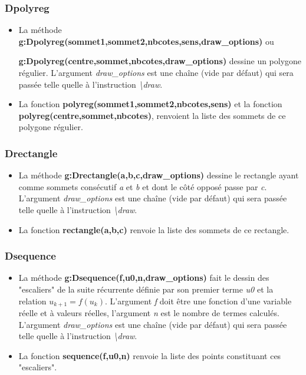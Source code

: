 \documentclass[%
10pt,%
a4paper,%
french,%
]%
{article}%
\begin{document}
\subsubsection{Dpolyreg}
\begin{itemize}
    \item La méthode \textbf{g:Dpolyreg(sommet1,sommet2,nbcotes,sens,draw\_options)} ou \par \textbf{g:Dpolyreg(centre,sommet,nbcotes,draw\_options)} dessine un polygone régulier. L'argument \emph{draw\_options} est une chaîne (vide par défaut) qui sera passée telle quelle à l'instruction \emph{\textbackslash draw}.
    \item La fonction \textbf{polyreg(sommet1,sommet2,nbcotes,sens)} et la fonction \textbf{polyreg(centre,sommet,nbcotes)}, renvoient la liste des sommets de ce polygone régulier.
\end{itemize}

\subsubsection{Drectangle}
\begin{itemize}
    \item La méthode \textbf{g:Drectangle(a,b,c,draw\_options)} dessine le rectangle ayant comme sommets consécutif \emph{a} et \emph{b} et dont le côté opposé passe par \emph{c}. L'argument \emph{draw\_options} est une chaîne (vide par défaut) qui sera passée telle quelle à l'instruction \emph{\textbackslash draw}.
    \item La fonction \textbf{rectangle(a,b,c)} renvoie la liste des sommets de ce rectangle.
\end{itemize}

\subsubsection{Dsequence}
\begin{itemize}
    \item La méthode \textbf{g:Dsequence(f,u0,n,draw\_options)} fait le dessin des "escaliers" de la suite récurrente définie par son premier terme \emph{u0} et la relation \(u_{k+1}=f(u_k)\). L'argument \emph{f} doit être une fonction d'une variable réelle et à valeurs réelles, l'argument \emph{n} est le nombre de termes calculés. L'argument \emph{draw\_options} est une chaîne (vide par défaut) qui sera passée telle quelle à l'instruction \emph{\textbackslash draw}.
    \item La fonction \textbf{sequence(f,u0,n)} renvoie la liste des points constituant ces "escaliers".
\end{itemize}
\end{document}
